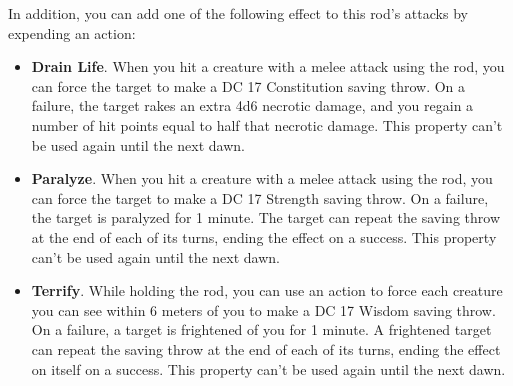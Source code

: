     In addition, you can add one of the following effect to this rod's attacks by expending an action:
    \begin{itemize}
        \item \textbf{Drain Life}.
        When you hit a creature with a melee attack using the rod, you can force the target to make a DC 17 Constitution saving throw.
        On a failure, the target rakes an extra 4d6 necrotic damage, and you regain a number of hit points equal to half that necrotic damage.
        This property can't be used again until the next dawn.
        \item \textbf{Paralyze}.
        When you hit a creature with a melee attack using the rod, you can force the target to make a DC 17 Strength saving throw.
        On a failure, the target is paralyzed for 1 minute.
        The target can repeat the saving throw at the end of each of its turns, ending the effect on a success.
        This property can't be used again until the next dawn.
        \item \textbf{Terrify}.
        While holding the rod, you can use an action to force each creature you can see within 6 meters of you to make a DC 17 Wisdom saving throw.
        On a failure, a target is frightened of you for 1 minute.
        A frightened target can repeat the saving throw at the end of each of its turns, ending the effect on itself on a success.
        This property can't be used again until the next dawn.
    \end{itemize}
